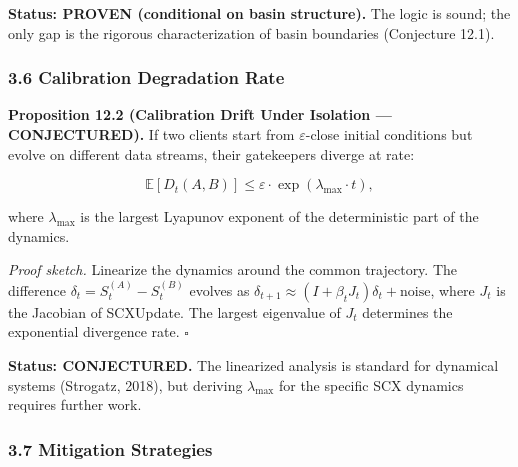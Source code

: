 \documentclass[
  12pt,
]{article}
\begin{document}
\textbf{Status: PROVEN (conditional on basin structure).} The logic is
sound; the only gap is the rigorous characterization of basin boundaries
(Conjecture 12.1).

\subsubsection{3.6 Calibration Degradation
Rate}\label{calibration-degradation-rate}

\textbf{Proposition 12.2 (Calibration Drift Under Isolation ---
CONJECTURED).} If two clients start from \(\varepsilon\)-close initial
conditions but evolve on different data streams, their gatekeepers
diverge at rate:

\[\mathbb{E}[D_t(A, B)] \leq \varepsilon \cdot \exp(\lambda_{\max} \cdot t),\]

where \(\lambda_{\max}\) is the largest Lyapunov exponent of the
deterministic part of the dynamics.

\emph{Proof sketch.} Linearize the dynamics around the common
trajectory. The difference \(\delta_t = S_t^{(A)} - S_t^{(B)}\) evolves
as \(\delta_{t+1} \approx (I + \beta_t J_t) \delta_t + \text{noise}\),
where \(J_t\) is the Jacobian of SCXUpdate. The largest eigenvalue of
\(J_t\) determines the exponential divergence rate. \(\square\)

\textbf{Status: CONJECTURED.} The linearized analysis is standard for
dynamical systems (Strogatz, 2018), but deriving \(\lambda_{\max}\) for
the specific SCX dynamics requires further work.

\subsubsection{3.7 Mitigation Strategies}\label{mitigation-strategies-2}
\end{document}
